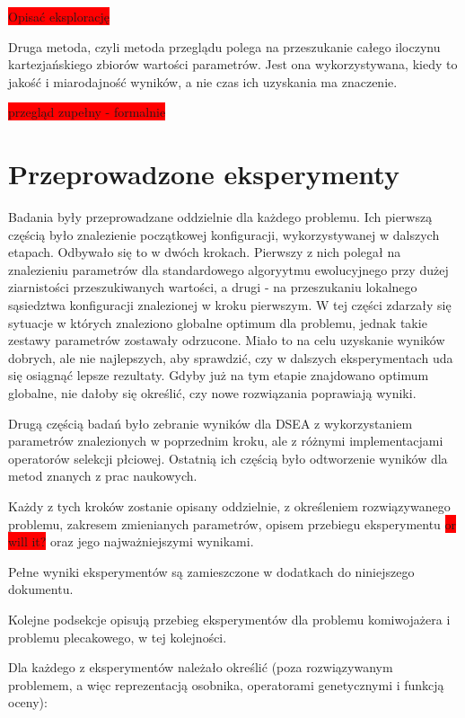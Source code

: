 \documentclass[twoside]{iisthesis}
\newcommand{\todo}{\colorbox{red}}
\begin{document}
\todo{Opisać eksplorację}

Druga metoda, czyli metoda przeglądu polega na przeszukanie całego iloczynu kartezjańskiego zbiorów wartości parametrów.
Jest ona wykorzystywana, kiedy to jakość i miarodajność wyników, a nie czas ich uzyskania ma znaczenie.

\todo{przegląd zupełny - formalnie}

\section{Przeprowadzone eksperymenty}

Badania były przeprowadzane oddzielnie dla każdego problemu.
Ich pierwszą częścią było znalezienie początkowej konfiguracji, wykorzystywanej w dalszych etapach.
Odbywało się to w dwóch krokach.
Pierwszy z nich polegał na znalezieniu parametrów dla standardowego algoryytmu ewolucyjnego przy dużej ziarnistości przeszukiwanych wartości, a drugi - na przeszukaniu lokalnego sąsiedztwa konfiguracji znalezionej w kroku pierwszym.
W tej części zdarzały się sytuacje w których znaleziono globalne optimum dla problemu, jednak takie zestawy parametrów zostawały odrzucone.
Miało to na celu uzyskanie wyników dobrych, ale nie najlepszych, aby sprawdzić, czy w dalszych eksperymentach uda się osiągnąć lepsze rezultaty.
Gdyby już na tym etapie znajdowano optimum globalne, nie dałoby się określić, czy nowe rozwiązania poprawiają wyniki.

Drugą częścią badań było zebranie wyników dla DSEA z wykorzystaniem parametrów znalezionych w poprzednim kroku, ale z różnymi implementacjami operatorów selekcji płciowej.
Ostatnią ich częścią było odtworzenie wyników dla metod znanych z prac naukowych.

Każdy z tych kroków zostanie opisany oddzielnie, z określeniem rozwiązywanego problemu, zakresem zmienianych parametrów, opisem przebiegu eksperymentu \todo{or will it?} oraz jego najważniejszymi wynikami.

Pełne wyniki eksperymentów są zamieszczone w dodatkach do niniejszego dokumentu.

Kolejne podsekcje opisują przebieg eksperymentów dla problemu komiwojażera i problemu plecakowego, w tej kolejności.

Dla każdego z eksperymentów należało określić (poza rozwiązywanym problemem, a więc reprezentacją osobnika, operatorami genetycznymi i funkcją oceny):
\end{document}
